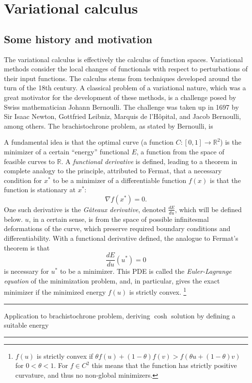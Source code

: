 \documentclass[11pt,a4paper]{memoir}
\newcommand{\todo}[1]{\vskip 0.1in \hrule \vskip 0.03in {#1} \vskip 0.03in \hrule \vskip 0.1in}
\begin{document}
\section{Variational calculus}
\subsection{Some history and motivation}

The variational calculus is effectively the calculus of function spaces. Variational methods consider the local changes of functionals with respect to perturbations
of their input functions. The calculus stems from techniques developed around the turn of the 18th century. A classical problem of a variational nature,
which was a great motivator for the development of these methods, is a challenge posed by Swiss mathematician Johann Bernoulli.
The challenge was taken up in 1697 by Sir Isaac Newton, Gottfried Leibniz, Marquis de l'H\^opital, and Jacob Bernoulli, among others. The
brachistochrone problem, as stated by Bernoulli, is \cite{johann_bernoulli}


A fundamental idea is that the optimal curve (a function $C:[0,1]\rightarrow \mathbb{R}^2$) is the minimizer of a certain ``energy'' functional $E$,
a function from the space of feasible curves to $\mathbb{R}$. A \textit{functional derivative} is defined, leading to a theorem in complete analogy to the principle, attributed to Fermat, that a necessary condition for $x^*$ to be a minimizer of a differentiable function $f(x)$ is that the function is stationary at $x^*$:
    $$\nabla f(x^*) = 0.$$
One such derivative is the \textit{G\^ateaux derivative}, denoted
$\frac{dE}{du}$, which will be defined below.
$u$, in a certain sense, is from the space of possible infinitesmal deformations of the curve, which preserve required boundary conditions and differentiability. With a functional derivative defined, the analogue to Fermat's theorem is that
    $$\frac{dE}{du}(u^*) = 0$$
is necessary for $u^*$ to be a minimizer. This PDE is called the \textit{Euler-Lagrange equation} of the minimization problem, and, in particular, gives the
exact minimizer if the minimized energy $f(u)$ is strictly convex.
\footnote{
$f(u)$ is strictly convex if $\theta f(u) + (1-\theta)f(v) > f(\theta u + (1 - \theta) v)$ for $0 < \theta < 1$. For $f \in C^2$ this means that the function has strictly positive curvature, and thus no non-global minimizers.
}
\todo{Application to brachistochrone problem, deriving $\cosh$ solution by defining a suitable energy}
\end{document}

